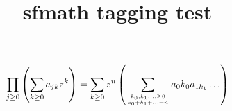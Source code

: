 \documentclass{article}
\title{sfmath tagging test}
\begin{document}
\begin{equation}
  \prod_{j\geq 0}
  \left(\sum_{k\geq 0}a_{jk} z^k\right) 
= \sum_{k\geq 0} z^n
  \left( \sum_{{k_0,k_1,\ldots\geq 0}
          \atop{k_0+k_1+\ldots=n}    }
        a{_0k_0}a_{1k_1}\ldots  \right) 
\end{equation}
\end{document}

